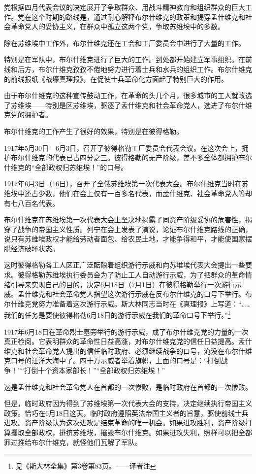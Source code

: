 党根据四月代表会议的决定展开了争取群众、用战斗精神教育和组织群众的巨大工作。党在这个时期的路线是，通过耐心解释布尔什维克的政策和揭穿孟什维克和社会革命党人的妥协主义，在群众中孤立这两个党，争取苏维埃中的多数。

除在苏维埃中工作外，布尔什维克还在工会和工厂委员会中进行了大量的工作。

特别是在军队中，布尔什维克进行了巨大的工作。到处都开始建立军事组织。在前线和后方，布尔什维克孜孜不倦地努力进行着士兵和水兵的组织工作。布尔什维克的前线报纸《战壕真理报》，在促使士兵革命化方面起了特别巨大的作用。

由于布尔什维克的这种宣传鼓动工作，在革命的头几个月，很多城市的工人就改选了苏维埃——特别是区苏维埃，驱逐了孟什维克和社会革命党人，选进了布尔什维克党的拥护者。

布尔什维克的工作产生了很好的效果，特别是在彼得格勒。

1917年5月30日—6月3日，召开了彼得格勒工厂委员会代表会议。在这次会上，拥护布尔什维克的代表已占四分之三。彼得格勒的无产阶级，差不多全体都拥护布尔什维克的“全部政权归苏维埃！”的口号。

1917年6月3日（16日），召开了全俄苏维埃第一次代表大会。布尔什维克当时在苏维埃中还占少数，他们在会上仅有一百多名代表，而孟什维克、社会革命党人等却有七八百名代表。

布尔什维克在苏维埃第一次代表大会上坚决地揭露了同资产阶级妥协的危害性，揭穿了战争的帝国主义性质。列宁在会上发表了演说，论证布尔什维克路线的正确，说只有苏维埃政权才能给劳动者面包、给农民土地，才能争得和平，才能使国家摆脱经济破坏状态。

这时彼得格勒各工人区正广泛酝酿着组织游行示威和向苏堆埃代表大会提出一些要求。彼得格勒苏维埃执行委员会为了防止工人自动游行示威，为了把群众的革命情绪引导来实现自己的目的，决定6月18日（7月1日）在彼得格勒举行一次游行示威。孟什维克和社会革命党人指望这次游行示威在反布尔什维克的口号下举行。布尔什维克党努力准备着这次游行示威。斯大林同志当时在《真理报》上写道：“……我们的任务是要使彼得格勒6月18日的游行示威在我们的革命口号下举行。”\footnote{见《斯大林全集》第3卷第83页。——译者注}

1917年6月18日在革命烈士墓旁举行的游行示威，成了布尔什维克党的力量的一次真正检阅。它表明群众的革命性日益高涨，对布尔什维克党的信任日益提高。孟什维克和社会革命党人提出的信任临时政府、必须继续战争的口号，淹没在布尔什维克口号的汪洋大海中了。四十万示威者举着旗帜，上面的口号是：“打倒战争！”“打倒十个资本家部长！”“全部政权归苏维埃！”

这是孟什维克和社会革命党人在首都的一次惨败，是临时政府在首都的一次惨败。

但是，临时政府因为得到了苏维埃第一次代表大会的支持，决定继续执行帝国主义政策。恰巧在6月18日这天，临时政府遵照英法帝国主义者的旨意，驱使前线士兵进攻。资产阶级认为这次进攻是结束革命的唯一机会。如果进攻胜利，资产阶级打算攫取全部政权，排挤苏维埃，摧毁布尔什维克。如果进攻失利，照样可以把全都罪过推给布尔什维克，就怪他们瓦解了军队。

